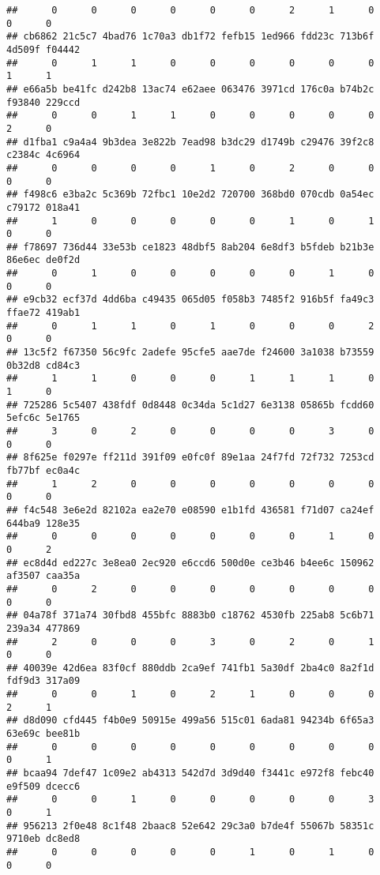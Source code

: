 \documentclass[
]{article}
\begin{document}
\begin{verbatim}
##      0      0      0      0      0      0      2      1      0      0      0 
## cb6862 21c5c7 4bad76 1c70a3 db1f72 fefb15 1ed966 fdd23c 713b6f 4d509f f04442 
##      0      1      1      0      0      0      0      0      0      1      1 
## e66a5b be41fc d242b8 13ac74 e62aee 063476 3971cd 176c0a b74b2c f93840 229ccd 
##      0      0      1      1      0      0      0      0      0      2      0 
## d1fba1 c9a4a4 9b3dea 3e822b 7ead98 b3dc29 d1749b c29476 39f2c8 c2384c 4c6964 
##      0      0      0      0      1      0      2      0      0      0      0 
## f498c6 e3ba2c 5c369b 72fbc1 10e2d2 720700 368bd0 070cdb 0a54ec c79172 018a41 
##      1      0      0      0      0      0      1      0      1      0      0 
## f78697 736d44 33e53b ce1823 48dbf5 8ab204 6e8df3 b5fdeb b21b3e 86e6ec de0f2d 
##      0      1      0      0      0      0      0      1      0      0      0 
## e9cb32 ecf37d 4dd6ba c49435 065d05 f058b3 7485f2 916b5f fa49c3 ffae72 419ab1 
##      0      1      1      0      1      0      0      0      2      0      0 
## 13c5f2 f67350 56c9fc 2adefe 95cfe5 aae7de f24600 3a1038 b73559 0b32d8 cd84c3 
##      1      1      0      0      0      1      1      1      0      1      0 
## 725286 5c5407 438fdf 0d8448 0c34da 5c1d27 6e3138 05865b fcdd60 5efc6c 5e1765 
##      3      0      2      0      0      0      0      3      0      0      0 
## 8f625e f0297e ff211d 391f09 e0fc0f 89e1aa 24f7fd 72f732 7253cd fb77bf ec0a4c 
##      1      2      0      0      0      0      0      0      0      0      0 
## f4c548 3e6e2d 82102a ea2e70 e08590 e1b1fd 436581 f71d07 ca24ef 644ba9 128e35 
##      0      0      0      0      0      0      0      1      0      0      2 
## ec8d4d ed227c 3e8ea0 2ec920 e6ccd6 500d0e ce3b46 b4ee6c 150962 af3507 caa35a 
##      0      2      0      0      0      0      0      0      0      0      0 
## 04a78f 371a74 30fbd8 455bfc 8883b0 c18762 4530fb 225ab8 5c6b71 239a34 477869 
##      2      0      0      0      3      0      2      0      1      0      0 
## 40039e 42d6ea 83f0cf 880ddb 2ca9ef 741fb1 5a30df 2ba4c0 8a2f1d fdf9d3 317a09 
##      0      0      1      0      2      1      0      0      0      2      1 
## d8d090 cfd445 f4b0e9 50915e 499a56 515c01 6ada81 94234b 6f65a3 63e69c bee81b 
##      0      0      0      0      0      0      0      0      0      0      1 
## bcaa94 7def47 1c09e2 ab4313 542d7d 3d9d40 f3441c e972f8 febc40 e9f509 dcecc6 
##      0      0      1      0      0      0      0      0      3      0      1 
## 956213 2f0e48 8c1f48 2baac8 52e642 29c3a0 b7de4f 55067b 58351c 9710eb dc8ed8 
##      0      0      0      0      0      1      0      1      0      0      0 

\end{verbatim}
\end{document}
